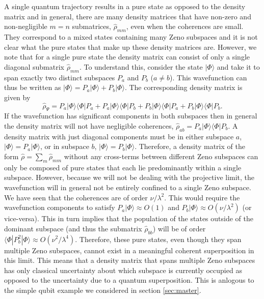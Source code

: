 A single quantum trajectory results in a pure state as opposed to the
density matrix and in general, there are many density matrices that
have non-zero and non-negligible $m = n$ submatrices,
$\hat{\rho}_{mm}$, even when the coherences are small. They correspond
to a mixed states containing many Zeno subspaces and it is not clear
what the pure states that make up these density matrices are. However,
we note that for a single pure state the density matrix can consist of
only a single diagonal submatrix $\hat{\rho}_{mm}$. To understand
this, consider the state $| \Phi \rangle$ and take it to span exactly
two distinct subspaces $P_a$ and $P_b$ ($a \ne b$). This wavefunction
can thus be written as
$| \Phi \rangle = P_a | \Phi \rangle + P_b | \Phi \rangle$. The
corresponding density matrix is given by
\begin{equation}
  \hat{\rho}_\Psi = P_a | \Phi \rangle \langle \Phi | P_a + P_a | \Phi
  \rangle \langle \Phi | P_b + P_b | \Phi \rangle \langle \Phi | P_a +
  P_b | \Phi \rangle \langle \Phi | P_b.
\end{equation}
If the wavefunction has significant components in both subspaces then
in general the density matrix will not have negligible coherences,
$\hat{\rho}_{ab} = P_a | \Phi \rangle \langle \Phi | P_b$. A density
matrix with just diagonal components must be in either subspace $a$,
$| \Phi \rangle = P_a | \Phi \rangle$, or in subspace $b$,
$| \Phi \rangle = P_b | \Phi \rangle$. Therefore, a density matrix of
the form $\hat{\rho} = \sum_m \hat{\rho}_{mm}$ without any cross-terms
between different Zeno subspaces can only be composed of pure states
that each lie predominantly within a single subspace. However, because
we will not be dealing with the projective limit, the wavefunction
will in general not be entirely confined to a single Zeno subspace. We
have seen that the coherences are of order $\nu/\lambda^2$. This would
require the wavefunction components to satisfy
$P_a | \Phi \rangle \approx O(1)$ and
$P_b | \Phi \rangle \approx O(\nu/\lambda^2)$ (or vice-versa). This in
turn implies that the population of the states outside of the dominant
subspace (and thus the submatrix $\hat{\rho}_{bb}$) will be of order
$\langle \Phi | P_b^2 | \Phi \rangle \approx
O(\nu^2/\lambda^4)$. Therefore, these pure states, even though they
span multiple Zeno subspaces, cannot exist in a meaningful coherent
superposition in this limit. This means that a density matrix that
spans multiple Zeno subspaces has only classical uncertainty about
which subspace is currently occupied as opposed to the uncertainty due
to a quantum superposition. This is anlogous to the simple qubit
example we considered in section \ref{sec:master}.
 
